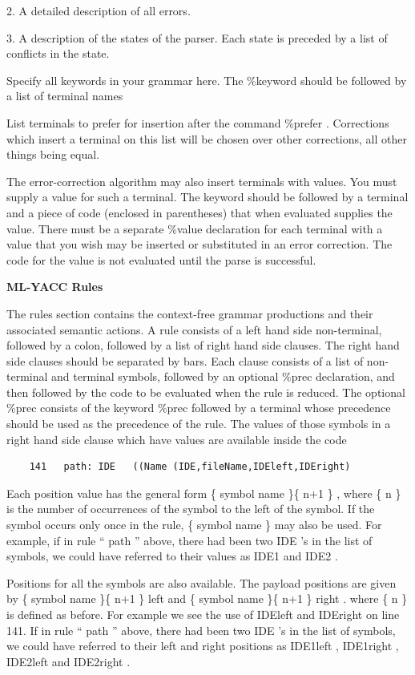 \documentclass[8pt, a4paper, oneside, twocolumn]{extarticle}
\begin{document}
2.  A detailed description of all errors.

3.  A description of the states of the parser. Each state is preceded by a list of conflicts
in the state.

Specify all keywords in your grammar here.  The
\%keyword
should be followed by a list
of terminal names

List terminals to prefer for insertion after the command
\%prefer
.  Corrections which
insert a terminal on this list will be chosen over other corrections, all other things being
equal.

The error-correction algorithm may also insert terminals with values.  You must supply
a value for such a terminal.  The keyword should be followed by a terminal and a piece
of code (enclosed in parentheses) that when evaluated supplies the value.  There must
be a separate
\%value
declaration for each terminal with a value that you wish may be
inserted or substituted in an error correction.  The code for the value is not evaluated
until the parse is successful.

\textbf{ML-YACC Rules}

The rules section contains the context-free grammar productions and their associated
semantic actions.
A rule consists
of a left hand side non-terminal, followed by a colon, followed by a list of right hand side
clauses. The right hand side clauses should be separated by bars.
Each clause consists of
a list of non-terminal and terminal symbols, followed by an optional
\%prec
declaration,
and then followed by the code to be evaluated when the rule is reduced.
The  optional
\%prec
consists  of  the  keyword
\%prec
followed by  a  terminal  whose
precedence should be used as the precedence of the rule.
The values of those symbols in a right hand side clause which have values are available
inside the code

\begin{verbatim}
    141   path: IDE   ((Name (IDE,fileName,IDEleft,IDEright)
\end{verbatim}
Each  position  value  has  the  general  form
\{
symbol  name
\}\{
n+1
\}
,  where
\{
n
\}
is  the
number of occurrences of the symbol to the left of the symbol.  If the symbol occurs
only once in the rule,
\{
symbol name
\}
may also be used.  For example, if in rule “
path
”
above, there had been two
IDE
’s in the list of symbols, we could have referred to their
values as
IDE1
and
IDE2
.

Positions for all the symbols are also available.  The payload positions are given by
\{
symbol  name
\}\{
n+1
\}
left
and
\{
symbol  name
\}\{
n+1
\}
right
.   where
\{
n
\}
is  defined  as
before.  For example we see the use of
IDEleft
and
IDEright
on line 141.
If in rule “
path
” above,  there had been two
IDE
’s in the list of symbols,  we could
have referred to their left and right positions as
IDE1left
,
IDE1right
,
IDE2left
and
IDE2right
.
\end{document}
